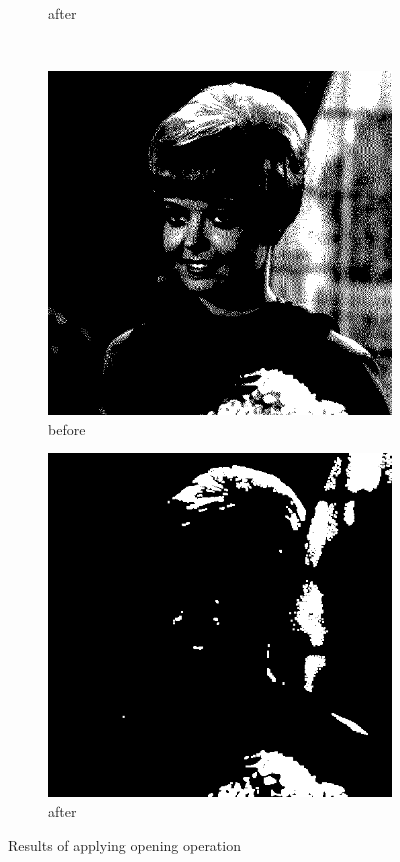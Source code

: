 \documentclass[12pt]{article}
\renewcommand{\subfiguresize}{.25\textwidth}
\begin{document}
\begin{figure}[H]
\begin{subfigure}[t]{\subfiguresize}
        \caption{after}
    \end{subfigure}\\[1em]
    \begin{subfigure}[t]{\subfiguresize}\centering
        \includegraphics[width=\textwidth]{img/magda/girlbw.png}
        \caption{before}
    \end{subfigure}
    \hspace{2em}
    \begin{subfigure}[t]{\subfiguresize}\centering
        \includegraphics[width=\textwidth]{img/magda/output2.png}
        \caption{after}
    \end{subfigure}
    \caption{Results of applying opening operation}
\end{figure}  
\end{document}
